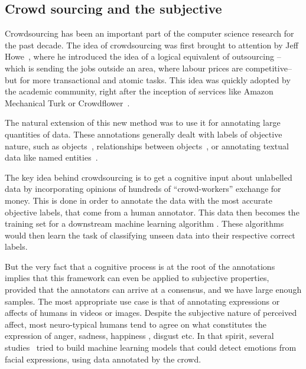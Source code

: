 \subsection{Crowd sourcing and the subjective}
Crowdsourcing has been an important part of the computer science research for the past decade. The idea of crowdsourcing was first brought to attention by Jeff Howe~\cite{howe2006rise}, where he introduced the idea of a logical equivalent of outsourcing -- which is sending the jobs outside an area, where labour prices are competitive-- but for more transactional and atomic tasks. This idea was quickly adopted by the academic community, right after the inception of services like Amazon Mechanical Turk or Crowdflower~\cite{paolacci2010running}.

The natural extension of this new method was to use it for annotating large quantities of data. These annotations generally dealt with labels of objective nature, such as objects~\cite{vondrick2013efficiently}, relationships between objects~\cite{krishna2017visual}, or annotating textual data like named entities~\cite{finin2010annotating}.

The key idea behind crowdsourcing is to get a cognitive input about unlabelled data by incorporating opinions of hundreds of ``crowd-workers'' exchange for money. This is done in order to annotate the data with the most accurate objective labels, that come from a human annotator. This data then becomes the training set for a downstream machine learning algorithm . These algorithms would then learn the task of classifying unseen data into their respective correct labels. 

But the very fact that a cognitive process is at the root of the annotations implies that this framework can even be applied to subjective properties, provided that the annotators can arrive at a consensus, and we have large enough samples. The most appropriate use case is that of annotating expressions or affects of humans in videos or images. Despite the subjective nature of perceived affect, most neuro-typical humans tend to agree on what constitutes the expression of anger, sadness, happiness , disgust etc. In that spirit, several studies~\cite{tavares2016crowdsourcing,katsimerou2016crowdsourcing,kim2016vinereactor} tried to build machine learning models that could detect emotions from facial expressions, using data annotated by the crowd.

